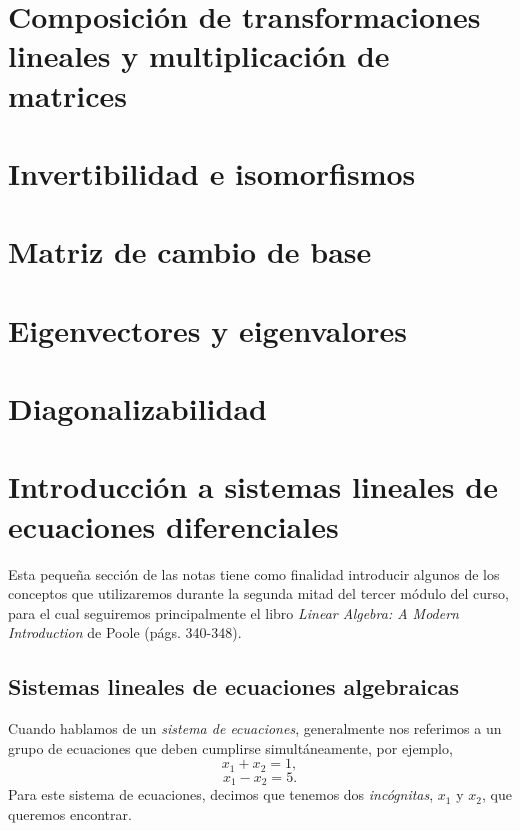 \documentclass[12pt,libertine]{book}
\begin{document}
\section{Composición de transformaciones lineales y multiplicación de matrices} \label{Sec: Composición de transformaciones lineales y multiplicación de matrices}

\section{Invertibilidad e isomorfismos} \label{Sec:Invertibilidad e isomorfismos}

\section{Matriz de cambio de base} \label{Sec:Matriz de cambio de base}

\section{Eigenvectores y eigenvalores} \label{Sec:Eigenvectores y eigenvalores} 

\section{Diagonalizabilidad} \label{Sec:Diagonalizabilidad} 

\newpage
\section{Introducción a sistemas lineales de ecuaciones diferenciales} \label{Sec: Sistemas lineales de ecuaciones diferenciales ordinarias} 

Esta pequeña sección de las notas tiene como finalidad introducir algunos de los conceptos que utilizaremos durante la segunda mitad del tercer módulo del curso, para el cual seguiremos principalmente el libro \emph{Linear Algebra: A Modern Introduction} de Poole (págs. 340-348).

\subsection*{Sistemas lineales de ecuaciones algebraicas}

Cuando hablamos de un \emph{sistema de ecuaciones}, generalmente nos referimos a un grupo de ecuaciones que deben cumplirse simultáneamente, por ejemplo, $$x_1 + x_2 = 1,$$ $$x_1 - x_2 = 5.$$ Para este sistema de ecuaciones, decimos que tenemos dos \emph{incógnitas}, $x_1$ y $x_2$, que queremos encontrar.
\end{document}

